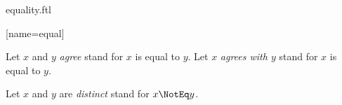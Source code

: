 \documentclass{stex}
\begin{document}
\begin{smodule}{equality.ftl}

[name=equal]{\mathrel{\comp=}}

\begin{forthel}
  \begin{convention}
    Let $x$ and $y$ \emph{agree} stand for $x$ is equal to $y$.
    Let $x$ \emph{agrees with $y$} stand for $x$ is equal to $y$.
  \end{convention}
\end{forthel}

\begin{forthel}
  \begin{convention}
    Let $x$ and $y$ are \emph{distinct} stand for $x \NotEq y$.
  \end{convention}
\end{forthel}

\end{smodule}
\end{document}
